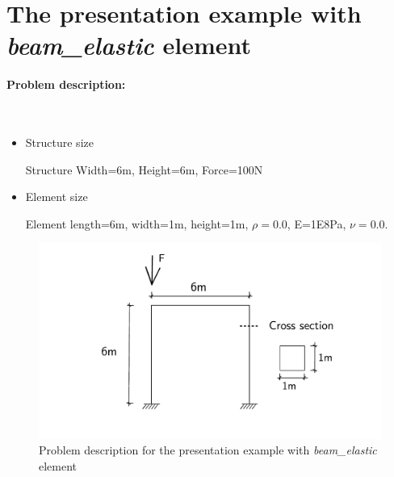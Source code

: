 \documentclass[fleqn,11pt]{article}
\begin{document}

\thispagestyle{fancy}


\tableofcontents{}








\newpage
\section{The presentation example with \emph{beam\_elastic} element}

\paragraph{Problem description:} ~

\begin{itemize}
  \item Structure size

    Structure Width=6m, Height=6m, Force=100N 

  \item Element size

    Element length=6m, width=1m, height=1m, $\rho=0.0$, E=1E8Pa, $\nu=0.0$.
\end{itemize}


\begin{figure}[H]
  \centering
  \includegraphics[width=12cm]{../Figure-files/beam_elastic_frame_descrip.pdf}
  \caption{Problem description for the presentation example with \emph{beam\_elastic} element}
  \label{fig Problem description for the presentation example with beam element}
\end{figure}
\end{document}
